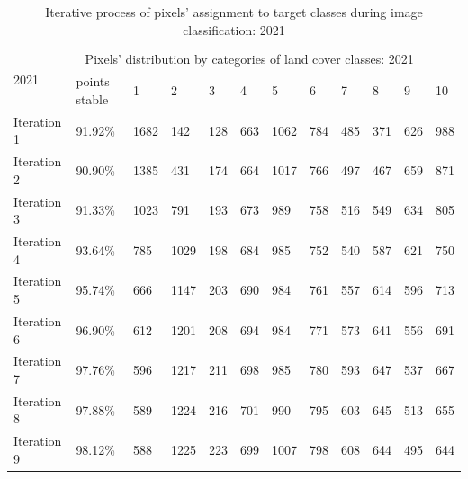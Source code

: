 \documentclass[jimaging,article,submit,pdftex,moreauthors]{Definitions/mdpi}
\begin{document}
\begin{table}[H]
  \centering
  \begin{tabularx}{\textwidth}{p{1.6cm}p{1.8cm}p{0.6cm}p{0.6cm}p{0.6cm}p{0.6cm}p{0.6cm}p{0.6cm}p{0.6cm}p{0.6cm}p{0.6cm}p{0.6cm}}
  \toprule
  \multirow{2}{*}{2021} & \multicolumn{10}{c}{Pixels' distribution by categories of land cover classes: 2021} \\
     & points stable & 1 & 2 &  3 & 4 & 5 & 6 & 7 & 8 & 9 & 10 \\
    \midrule
    Iteration 1 & 91.92\% & 1682    &    142    &    128    &    663    &   1062&
        784    &    485     &   371    &    626   &     988 \\
    Iteration 2 & 90.90\% & 1385    &    431    &    174    &    664    &   1017&
        766    &    497    &    467    &    659   &     871 \\
    Iteration 3 & 91.33\% & 1023   &     791     &   193   &     673    &    989&
        758    &    516    &    549      &  634    &    805 \\
    Iteration 4 & 93.64\% & 785  &     1029    &    198   &     684   &     985&
        752   &     540    &    587   &     621     &   750 \\
    Iteration 5 & 95.74\% & 666    &   1147   &     203    &    690   &     984 &
        761  &      557   &     614    &    596    &    713 \\
    Iteration 6 & 96.90\% & 612    &   1201   &     208    &    694   &     984 &
        771      &  573 &       641     &   556     &   691 \\
    Iteration 7 & 97.76\% & 596     &  1217   &     211    &    698     &   985 &
        780    &    593    &    647   &     537    &    667\\
    Iteration 8 & 97.88\% & 589   &    1224   &     216     &   701    &    990 &
        795    &    603   &     645     &   513     &   655 \\
    Iteration 9 & 98.12\% & 588   &    1225   &     223    &    699    &   1007 &
        798  &      608    &    644  &      495   &     644 \\
\bottomrule
\end{tabularx}
  \caption{Iterative process of pixels' assignment to target classes during image classification: 2021}
  \label{tabB3}
\end{table}
\end{document}
